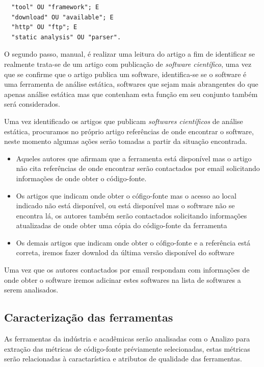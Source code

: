 \documentclass[qual, classic, a4paper]{ufbathesis}
\begin{document}
\begin{verbatim}
  "tool" OU "framework"; E
  "download" OU "available"; E
  "http" OU "ftp"; E
  "static analysis" OU "parser".
\end{verbatim}

O segundo passo, manual, é realizar uma leitura do artigo a fim de identificar
se realmente trata-se de um artigo com publicação de {\it software
científico}, uma vez que se confirme que o artigo publica um software,
identifica-se se o software é uma ferramenta de análise estática, softwares
que sejam mais abrangentes do que apenas análise estática mas que contenham
esta função em seu conjunto também será considerados.

Uma vez identificado os artigos que publicam {\it softwares científicos} de
análise estática, procuramos no próprio artigo referências de onde encontrar o
software, neste momento algumas ações serão tomadas a partir da situação
encontrada.

\begin{itemize}

  \item Aqueles autores que afirmam que a ferramenta está disponível mas o
    artigo não cita referências de onde encontrar serão contactados por email
    solicitando informações de onde obter o código-fonte.

  \item Os artigos que indicam onde obter o cófigo-fonte mas o acesso ao local
    indicado não está disponível, ou está disponível mas o software não se
    encontra lá, os autores também serão contactados solicitando informações
    atualizadas de onde obter uma cópia do código-fonte da ferramenta

  \item Os demais artigos que indicam onde obter o cófigo-fonte e a referência
    está correta, iremos fazer downlod da última versão disponível do software

\end{itemize}

Uma vez que os autores contactados por email respondam com informações de onde
obter o software iremos adicinar estes softwares na lista de softwares a serem
analisados.

\subsection{Caracterização das ferramentas}

As ferramentas da indústria e acadêmicas serão analisadas com o Analizo para
extração das métricas de código-fonte préviamente
selecionadas, estas métricas serão relacionadas à caractarística e atributos
de qualidade das ferramentas.
\end{document}
